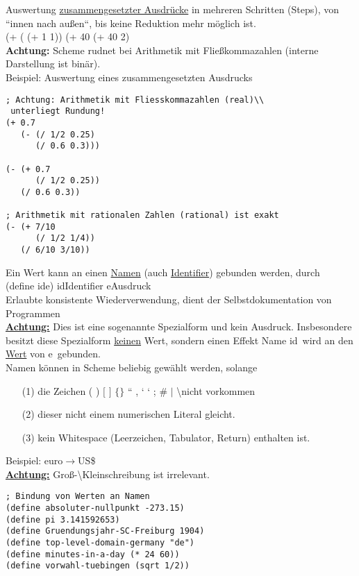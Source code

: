 Auswertung \underline{zusammengesetzter Ausdr\"ucke} in mehreren Schritten (Steps), von ``innen nach au\ss en``, bis keine Reduktion mehr m\"oglich ist.\\
(+ (  (+ 1 1)) \eval (+ 40  \eval (+ 40 2) \\
\textbf{Achtung:} Scheme rudnet bei Arithmetik mit Flie\ss kommazahlen (interne Darstellung ist bin\"ar).\\
Beispiel: Auswertung eines zusammengesetzten Ausdrucks 
\begin{lstlisting}[frame=single]
; Achtung: Arithmetik mit Fliesskommazahlen (real)\\
 unterliegt Rundung!
(+ 0.7
   (- (/ 1/2 0.25)
      (/ 0.6 0.3)))

(- (+ 0.7
      (/ 1/2 0.25))
   (/ 0.6 0.3))

; Arithmetik mit rationalen Zahlen (rational) ist exakt
(- (+ 7/10
      (/ 1/2 1/4))
   (/ 6/10 3/10))
\end{lstlisting}
Ein Wert kann an einen \underline{Namen} (auch \underline{Identifier}) gebunden werden, durch \\
(define \auf id\zu \auf e\zu) \hspace*{1.5cm} \auf id\zu Identifier \auf e\zu Ausdruck\\
Erlaubte konsistente Wiederverwendung, dient der Selbstdokumentation von Programmen\\
\textbf{\underline{Achtung:}} Dies ist eine sogenannte Spezialform und kein Ausdruck. Insbesondere besitzt diese Spezialform \underline{keinen} Wert, sondern einen Effekt Name \auf id\zu \ wird an den \underline{Wert} von \auf e\zu \ gebunden. \\
Namen k\"onnen in Scheme beliebig gewählt werden, solange
\begin{enumerate}
\item[(1)] die Zeichen ( ) $[$ $]$ $\{ \}$ `` , ` ` ; \# $\mid$ \textbackslash nicht vorkommen
\item[(2)] dieser nicht einem numerischen Literal gleicht.
\item[(3)] kein Whitespace (Leerzeichen, Tabulator, Return) enthalten ist.
\end{enumerate}
Beispiel: euro$\rightarrow$US\$\\
\underline{\textbf{Achtung:}} Gro\ss-\textbackslash Kleinschreibung ist irrelevant.
\bigskip\\
\begin{lstlisting}[frame=single]
; Bindung von Werten an Namen
(define absoluter-nullpunkt -273.15)
(define pi 3.141592653)
(define Gruendungsjahr-SC-Freiburg 1904)
(define top-level-domain-germany "de")
(define minutes-in-a-day (* 24 60))
(define vorwahl-tuebingen (sqrt 1/2))
\end{lstlisting}
